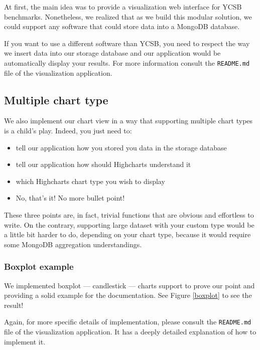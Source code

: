 \documentclass[a4paper,11pt]{report}
\begin{document}
At first, the main idea was to provide a visualization web interface for YCSB benchmarks. Nonetheless, we realized that as we build this modular solution, we could support any software that could store data into a MongoDB database.

If you want to use a different software than YCSB, you need to respect the way we insert data into our storage database and our application would be automatically display your results. For more information consult the \texttt{README.md} file of the visualization application.

\subsection{Multiple chart type}

We also implement our chart view in a way that supporting multiple chart types is a child's play. Indeed, you just need to:

\begin{itemize}
\item
tell our application how you stored you data in the storage database
\item
tell our application how should Highcharts understand it
\item
which Highcharts chart type you wish to display
\item
No, that's it! No more bullet point!
\end{itemize}

These three points are, in fact, trivial functions that are obvious and effortless to write. On the contrary, supporting large dataset with your custom type would be a little bit harder to do, depending on your chart type, because it would require some MongoDB aggregation understandings.

\subsubsection{Boxplot example}

We implemented boxplot --- candlestick --- charts support to prove our point and providing a solid example for the documentation. See Figure \ref{boxplot} to see the result!

Again, for more specific details of implementation, please consult the \texttt{README.md} file of the visualization application. It has a deeply detailed explanation of how to implement it.
\end{document}
